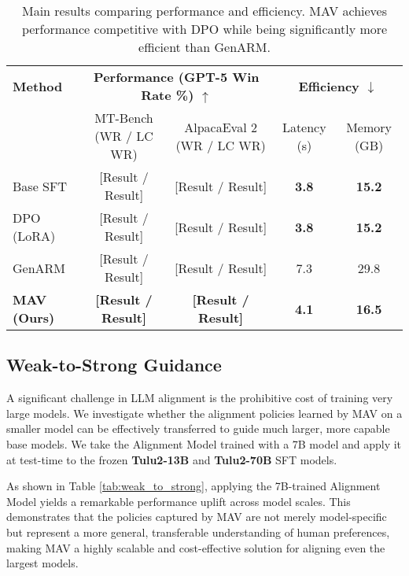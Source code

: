\documentclass{article} %
\begin{document}
\begin{table}[h!]
\centering
\caption{Main results comparing performance and efficiency. MAV achieves performance competitive with DPO while being significantly more efficient than GenARM.}
\label{tab:main_results}
\begin{tabular}{@{}l|cc|cc@{}}
\toprule
\textbf{Method} & \multicolumn{2}{c|}{\textbf{Performance (GPT-5 Win Rate \%) $\uparrow$}} & \multicolumn{2}{c}{\textbf{Efficiency $\downarrow$}} \\
& MT-Bench (WR / LC WR) & AlpacaEval 2 (WR / LC WR) & Latency (s) & Memory (GB) \\
\midrule
Base SFT & [Result / Result] & [Result / Result] & \textbf{3.8} & \textbf{15.2} \\
DPO (LoRA) & [Result / Result] & [Result / Result] & \textbf{3.8} & \textbf{15.2} \\
GenARM & [Result / Result] & [Result / Result] & 7.3 & 29.8 \\
\textbf{MAV (Ours)} & \textbf{[Result / Result]} & \textbf{[Result / Result]} & \textbf{4.1} & \textbf{16.5} \\
\bottomrule
\end{tabular}
\end{table}

\subsection{Weak-to-Strong Guidance}
A significant challenge in LLM alignment is the prohibitive cost of training very large models. We investigate whether the alignment policies learned by MAV on a smaller model can be effectively transferred to guide much larger, more capable base models. We take the Alignment Model trained with a 7B model and apply it at test-time to the frozen \textbf{Tulu2-13B} and \textbf{Tulu2-70B} SFT models.

As shown in Table \ref{tab:weak_to_strong}, applying the 7B-trained Alignment Model yields a remarkable performance uplift across model scales. This demonstrates that the policies captured by MAV are not merely model-specific but represent a more general, transferable understanding of human preferences, making MAV a highly scalable and cost-effective solution for aligning even the largest models.
\end{document}

